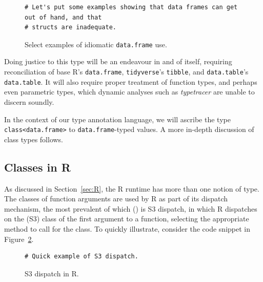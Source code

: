 \documentclass[acmsmall,review,anonymous]{acmart}\settopmatter{printfolios=true,printccs=false,printacmref=false}
\newcommand{\code}[1]{{\lstinline[style=Rin]!#1!}\xspace}
\newcommand{\typetracer}{\emph{typetracer}\xspace} %
\begin{document}
\begin{figure}[htbp]
\begin{center}

\begin{lstlisting}
# Let's put some examples showing that data frames can get out of hand, and that
# structs are inadequate.
\end{lstlisting}

\caption{Select examples of idiomatic \code{data.frame} use.}
\label{fig:data-frames-bad}
\end{center}
\end{figure}

Doing justice to this type will be an endeavour in and of itself, requiring reconciliation of base R's \code{data.frame}, \code{tidyverse}'s \code{tibble}, and \code{data.table}'s \code{data.table}.
It will also require proper treatment of function types, and perhaps even parametric types, which dynamic analyses such as \typetracer are unable to discern soundly.

In the context of our type annotation language, we will ascribe the type \code{class<data.frame>} to \code{data.frame}-typed values.
A more in-depth discussion of class types follows.

%
%
%
%
\subsection{Classes in R}

As discussed in Section~\ref{sec:R}, the R runtime has more than one notion of type.  
The classes of function arguments are used by R as part of its dispatch mechanism, the most prevalent of which () is S3 dispatch, in which R dispatches on the (S3) class of the first argument to a function, selecting the appropriate method to call for the class.
To quickly illustrate, consider the code snippet in Figure~\ref{fig:dispatch-ex}.

\begin{figure}[htbp]
\begin{center}

\begin{lstlisting}
# Quick example of S3 dispatch.
\end{lstlisting}

\caption{S3 dispatch in R.}
\label{fig:dispatch-ex}
\end{center}
\end{figure}
\end{document}
